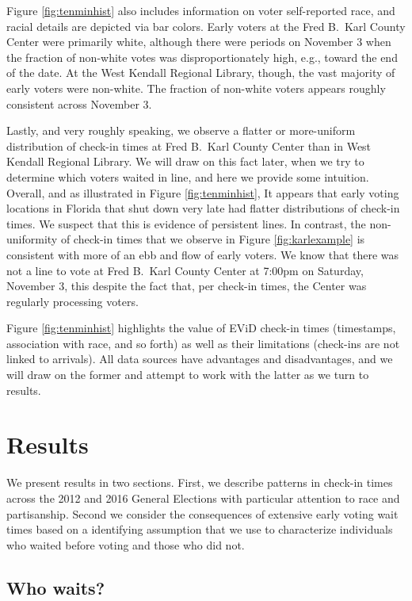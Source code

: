 \documentclass[12pt,titlepage]{article}
\begin{document}
Figure \ref{fig:tenminhist} also includes information on voter
self-reported race, and racial details are depicted via bar colors.
Early voters at the Fred B.\ Karl County Center were primarily white,
although there were periods on November 3 when the fraction of
non-white votes was disproportionately high, e.g., toward the end of
the date.  At the West Kendall Regional Library, though, the vast
majority of early voters were non-white.  The fraction of non-white
voters appears roughly consistent across November 3.

Lastly, and very roughly speaking, we observe a flatter or
more-uniform distribution of check-in times at Fred B.\ Karl County
Center than in West Kendall Regional Library.  We will draw on this
fact later, when we try to determine which voters waited in line, and
here we provide some intuition.  Overall, and as illustrated in Figure
\ref{fig:tenminhist}, It appears that early voting locations in
Florida that shut down very late had flatter distributions of check-in
times.  We suspect that this is evidence of persistent lines.  In
contrast, the non-uniformity of check-in times that we observe in
Figure \ref{fig:karlexample} is consistent with more of an ebb and
flow of early voters.  We know that there was not a line to vote at
Fred B.\ Karl County Center at 7:00pm on Saturday, November 3, this
despite the fact that, per check-in times, the Center was regularly
processing voters.

Figure \ref{fig:tenminhist} highlights the value of EViD check-in
times (timestamps, association with race, and so forth) as well as
their limitations (check-ins are not linked to arrivals).  All data
sources have advantages and disadvantages, and we will draw on the
former and attempt to work with the latter as we turn to results.

\section*{Results}

We present results in two sections.  First, we describe patterns in
check-in times across the 2012 and 2016 General Elections with
particular attention to race and partisanship.  Second we consider the
consequences of extensive early voting wait times based on a
identifying assumption that we use to characterize individuals who
waited before voting and those who did not.

\subsection*{Who waits?}
\end{document}
